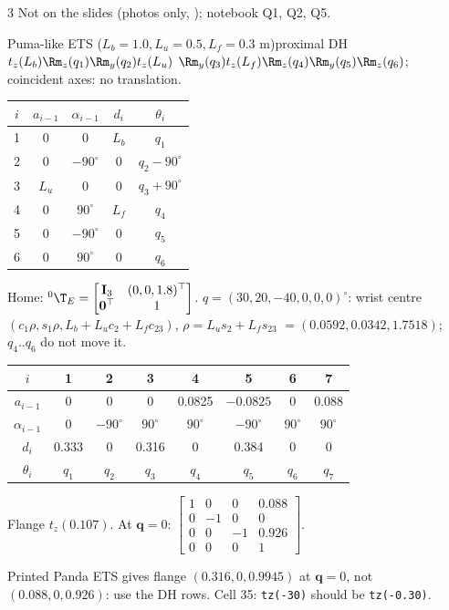 \begin{multicols}{3}
Not on the slides (photos only, ); notebook Q1, Q2, Q5.
\begin{twoway}{Puma-like ETS ($L_b{=}1.0,L_u{=}0.5,L_f{=}0.3$ m)}{proximal DH}
$t_z(L_b)\Rm_z(q_1)\Rm_y(q_2)t_z(L_u)$ $\Rm_y(q_3)t_z(L_f)\Rm_z(q_4)\Rm_y(q_5)\Rm_z(q_6)$; coincident axes: no translation.
\tcblower
\scriptsize\renewcommand{\arraystretch}{1}\begin{tabular}{@{}c|cccc@{}}$i$&$a_{i-1}$&$\alpha_{i-1}$&$d_i$&$\theta_i$\\\hline
1&0&0&$L_b$&$q_1$\\2&0&$-90^\circ$&0&$q_2{-}90^\circ$\\3&$L_u$&0&0&$q_3{+}90^\circ$\\4&0&$90^\circ$&$L_f$&$q_4$\\5&0&$-90^\circ$&0&$q_5$\\6&0&$90^\circ$&0&$q_6$\end{tabular}
\end{twoway}
Home: ${}^0\T_E=\begin{bmatrix}\mathbf I_3&(0,0,1.8)^\top\\\mathbf 0^\top&1\end{bmatrix}$. $q=(30,20,-40,0,0,0)^\circ$: wrist centre $(c_1\rho,s_1\rho,L_b+L_uc_2+L_fc_{23})$, $\rho=L_us_2+L_fs_{23}$ $=(0.0592,0.0342,1.7518)$; $q_4..q_6$ do not move it. \chk
\begin{fbx}
\scriptsize\renewcommand{\arraystretch}{1.05}\begin{tabular}{@{}c|ccccccc@{}}$i$&1&2&3&4&5&6&7\\\hline
$a_{i-1}$&0&0&0&0.0825&$-0.0825$&0&0.088\\
$\alpha_{i-1}$&0&$-90^\circ$&$90^\circ$&$90^\circ$&$-90^\circ$&$90^\circ$&$90^\circ$\\
$d_i$&0.333&0&0.316&0&0.384&0&0\\
$\theta_i$&$q_1$&$q_2$&$q_3$&$q_4$&$q_5$&$q_6$&$q_7$\end{tabular}\par
Flange $t_z(0.107)$. At $\mathbf q=0$: $\begin{bmatrix}1&0&0&0.088\\0&-1&0&0\\0&0&-1&0.926\\0&0&0&1\end{bmatrix}$. \chk
\end{fbx}
\begin{slideerr}
Printed Panda ETS gives flange $(0.316,0,0.9945)$ at $\mathbf q=0$, not $(0.088,0,0.926)$: use the DH rows. Cell 35: \texttt{tz(-30)} should be \texttt{tz(-0.30)}. \chk
\end{slideerr}


\end{multicols}
